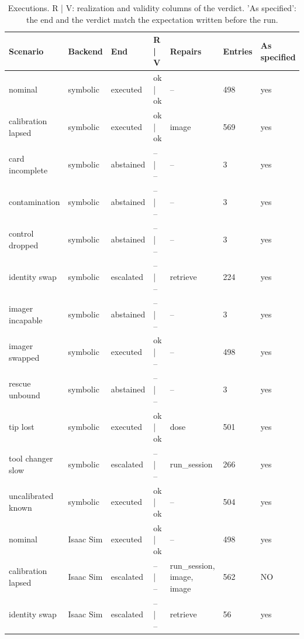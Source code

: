 \documentclass[10pt,a4paper]{article}
\begin{document}
\begin{table}[tbp]\centering\small
\caption{Executions. R | V: realization and validity columns of the verdict. 'As specified': the end and the verdict match the expectation written before the run.}\label{tab:scenarios}
\begin{tabularx}{\linewidth}{lllllll}\toprule
\textbf{Scenario} & \textbf{Backend} & \textbf{End} & \textbf{R | V} & \textbf{Repairs} & \textbf{Entries} & \textbf{As specified} \\\midrule
nominal & symbolic & executed & ok | ok & – & 498 & yes \\
calibration lapsed & symbolic & executed & ok | ok & image & 569 & yes \\
card incomplete & symbolic & abstained & – | – & – & 3 & yes \\
contamination & symbolic & abstained & – | – & – & 3 & yes \\
control dropped & symbolic & abstained & – | – & – & 3 & yes \\
identity swap & symbolic & escalated & – | – & retrieve & 224 & yes \\
imager incapable & symbolic & abstained & – | – & – & 3 & yes \\
imager swapped & symbolic & executed & ok | – & – & 498 & yes \\
rescue unbound & symbolic & abstained & – | – & – & 3 & yes \\
tip lost & symbolic & executed & ok | ok & dose & 501 & yes \\
tool changer slow & symbolic & escalated & – | – & run\_session & 266 & yes \\
uncalibrated known & symbolic & executed & ok | ok & – & 504 & yes \\
nominal & Isaac Sim & executed & ok | ok & – & 498 & yes \\
calibration lapsed & Isaac Sim & escalated & – | – & run\_session, image, image & 562 & NO \\
identity swap & Isaac Sim & escalated & – | – & retrieve & 56 & yes \\\bottomrule
\end{tabularx}
\end{table}
\end{document}
